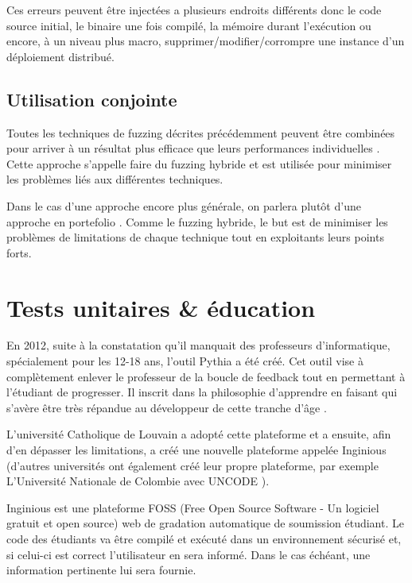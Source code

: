 \documentclass[a4paper]{report}
\begin{document}
Ces erreurs peuvent être injectées a plusieurs endroits différents donc le code source initial, le binaire une fois compilé, la mémoire durant l'exécution ou encore, à un niveau plus macro, supprimer/modifier/corrompre une instance d'un déploiement distribué\cite{Avresky1996}.

\subsection{Utilisation conjointe}

Toutes les techniques de fuzzing décrites précédemment peuvent être combinées pour arriver à un résultat plus efficace que leurs performances individuelles \cite{Godefroid2020}.
Cette approche s'appelle faire du fuzzing hybride et est utilisée pour minimiser les problèmes liés aux différentes techniques. 


Dans le cas d'une approche encore plus générale, on parlera plutôt d'une approche en portefolio \cite{Godefroid2020}.
Comme le fuzzing hybride, le but est de minimiser les problèmes de limitations de chaque technique tout en exploitants leurs points forts.

\section{Tests unitaires \& éducation}

En 2012, suite à la constatation qu'il manquait des professeurs d'informatique, spécialement pour les 12-18 ans, l'outil Pythia a été créé.
Cet outil vise à complètement enlever le professeur de la boucle de feedback tout en permettant à l'étudiant de progresser. Il inscrit dans la philosophie d'apprendre en faisant qui s'avère être très répandue au développeur de cette tranche d'âge \cite{combefis2012teaching}.

L'université Catholique de Louvain a adopté cette plateforme et a ensuite, afin d'en dépasser les limitations, a créé une nouvelle plateforme appelée Inginious (d'autres universités ont également créé leur propre plateforme, par exemple L'Université Nationale de Colombie avec UNCODE \cite{restrepo2018uncode}).

Inginious est une plateforme FOSS (Free Open Source Software - Un logiciel gratuit et open source) web de gradation automatique de soumission étudiant.
Le code des étudiants va être compilé et exécuté dans un environnement sécurisé et, si celui-ci est correct l'utilisateur en sera informé.
Dans le cas échéant, une information pertinente lui sera fournie.
\end{document}
